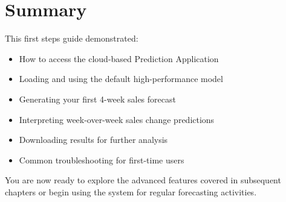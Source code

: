 \section{Summary}

This first steps guide demonstrated:

\begin{itemize}
	\item How to access the cloud-based Prediction Application
	\item Loading and using the default high-performance model
	\item Generating your first 4-week sales forecast
	\item Interpreting week-over-week sales change predictions
	\item Downloading results for further analysis
	\item Common troubleshooting for first-time users
\end{itemize}

You are now ready to explore the advanced features covered in subsequent chapters or begin using the system for regular forecasting activities.

